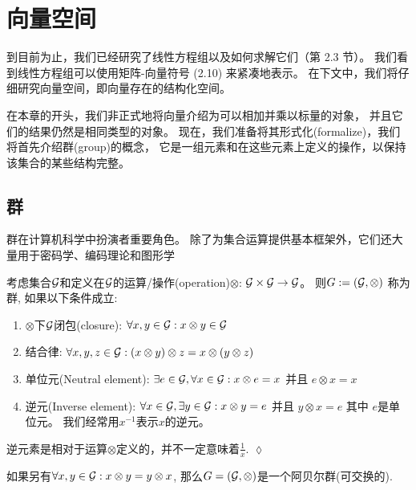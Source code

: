 \section{向量空间}

到目前为止，我们已经研究了线性方程组以及如何求解它们（第 2.3 节）。
我们看到线性方程组可以使用矩阵-向量符号 (2.10) 来紧凑地表示。
在下文中，我们将仔细研究向量空间，即向量存在的结构化空间。

在本章的开头，我们非正式地将向量介绍为可以相加并乘以标量的对象，
并且它们的结果仍然是相同类型的对象。
现在，我们准备将其形式化(formalize)，我们将首先介绍群(group)的概念，
它是一组元素和在这些元素上定义的操作，以保持该集合的某些结构完整。

\subsection{群}

群在计算机科学中扮演者重要角色。
除了为集合运算提供基本框架外，它们还大量用于密码学、编码理论和图形学

\begin{definition}[群]
    考虑集合$\mathcal{G}$和定义在$\mathcal{G}$的运算/操作(operation)$\otimes$:
    $\mathcal{G} \times \mathcal{G} \rightarrow \mathcal{G}$。
    则$G := (\mathcal{G}, \otimes)$ 称为群, 如果以下条件成立:
    \begin{enumerate}
        \item $\otimes$下$\mathcal{G}$闭包(closure): $\forall x,y \in \mathcal{G} : x \otimes y \in \mathcal{G}$
        \item 结合律: $\forall x,y,z \in \mathcal{G}: (x \otimes y) \otimes z = x \otimes (y \otimes z)$
        \item 单位元(Neutral element): $\exists e \in \mathcal{G}, \forall x \in \mathcal{G} : x \otimes e = x$ 并且 $e \otimes x = x$
        \item 逆元(Inverse element): $\forall x \in \mathcal{G}, \exists y \in \mathcal{G} : x \otimes y = e$ 并且 $y \otimes x = e$
        其中 $e$是单位元。
        我们经常用$x^{-1}$表示$x$的逆元。
    \end{enumerate}
\end{definition}
\begin{remark}
    逆元素是相对于运算$\otimes$定义的，并不一定意味着$\frac{1}{x}$.
    \hfill $\lozenge$
\end{remark}
如果另有$\forall x, y \in \mathcal{G} : x \otimes y = y \otimes x$,
那么$G = (\mathcal{G}, \otimes)$是一个阿贝尔群(可交换的).

